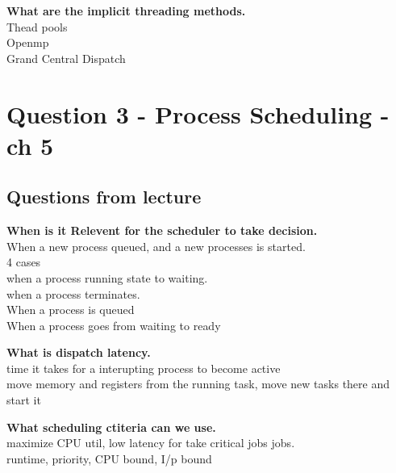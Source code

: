 \documentclass[a4paper,10pt,titlepage]{report}
\begin{document}
\textbf{What are the implicit threading methods.\\}
\hspace{10mm} Thead pools \\
\hspace{10mm} Openmp \\
\hspace{10mm} Grand Central Dispatch \\

\newpage

\section{Question 3 - Process Scheduling - ch 5}

\subsection{Questions from lecture}
\textbf{When is it Relevent for the scheduler to take  decision.\\}
\hspace{10mm}When a new process queued, and a new processes is started.\\
\hspace{10mm}4 cases\\
\hspace{20mm}when a process running state to waiting.\\
\hspace{20mm}when a process terminates.\\
\hspace{20mm}When a process is queued\\
\hspace{20mm}When a process goes from waiting to ready\\ \vspace{5mm}

\textbf{What is dispatch latency.\\}
\hspace{10mm} time it takes for a interupting process to become active \\
\hspace{10mm} move memory and registers from the running task, move new tasks there and start it \\\vspace{5mm}



\textbf{What scheduling ctiteria can we use.\\}
\hspace{10mm} maximize CPU util, low latency for take critical jobs jobs.\\
\hspace{10mm} runtime, priority, CPU bound, I/p bound \\\vspace{5mm}
\end{document}
